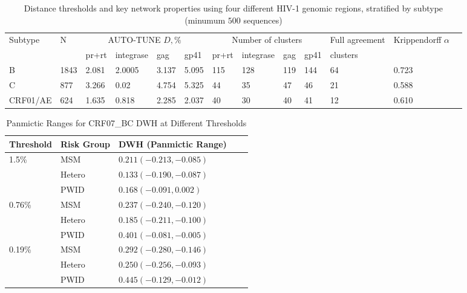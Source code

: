 \documentclass[utf8]{FrontiersinHarvard} %
\begin{document}
\begin{table}[h]
	\caption{Distance thresholds and key network properties using four different HIV-1 genomic regions, stratified by subtype (minumum $500$ sequences)}

	\vspace{10pt}
	\centering
	\begin{ssmall}
		\label{tab:LANL:full}
		\begin{tabular}{lllllllllllll}
			\hline
			Subtype  & N    & \multicolumn{4}{c}{AUTO-TUNE $D, \%$} & \multicolumn{4}{c}{Number of clusters} & Full agreement & Krippendorff $\alpha$                                                     \\
			         &      & pr+rt                                 & integrase                              & gag            & gp41                  & pr+rt & integrase & gag & gp41 & clusters &       \\
			\hline

			B        & 1843 & 2.081                                 & 2.0005                                 & 3.137          & 5.095                 & 115   & 128       & 119 & 144  & 64       & 0.723
			\\ C & 877 & 3.266 & 0.02 & 4.754 & 5.325 & 44 & 35 & 47 & 46 & 21 & 0.588 \\
			CRF01/AE & 624  & 1.635                                 & 0.818                                  & 2.285          & 2.037                 & 40    & 30        & 40  & 41   & 12       & 0.610
			\\

			\hline
		\end{tabular}
	\end{ssmall}
\end{table}

\begin{table}[h!]
	\centering
	\begin{tabular}{lllll}
		\hline
		Threshold & Risk Group & DWH   (Panmictic Range)   \\
		\hline
		1.5\%     & MSM        & $0.211  (-0.213, -0.085)$ \\
		          & Hetero     & $0.133 (-0.190, -0.087)$  \\
		          & PWID       & $0.168 (-0.091, 0.002)$   \\
		\hline
		0.76\%    & MSM        & $0.237 (-0.240, -0.120)$  \\
		          & Hetero     & $0.185 (-0.211, -0.100)$  \\
		          & PWID       & $0.401 (-0.081, -0.005)$  \\
		\hline
		0.19\%    & MSM        & $0.292 (-0.280, -0.146)$  \\
		          & Hetero     & $0.250 (-0.256, -0.093)$  \\
		          & PWID       & $0.445 (-0.129, -0.012)$  \\
		\hline
	\end{tabular}
	\caption{Panmictic Ranges for CRF07\_BC DWH at Different Thresholds}
	\label{table:panmictic}
\end{table}
\end{document}
